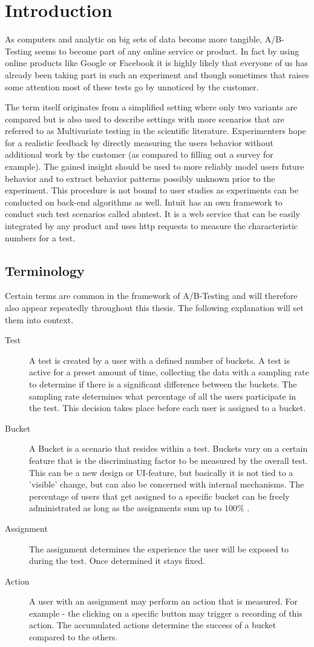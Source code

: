 \documentclass[main.tex]{subfiles}
\begin{document}
\chapter{Introduction}
As computers and analytic on big sets of data become more tangible, A/B-Testing seems to become part of any online service or product. In fact by using online products like Google or Facebook it is highly likely that everyone of us has already been taking part in such an experiment and though sometimes that raises some attention \cite{arthur2014facebook} most of these tests go by unnoticed by the customer. 

The term itself originates from a simplified setting where only two variants are compared but is also used to describe settings with more scenarios that are referred to as Multivariate testing in the scientific literature. Experimenters hope for a realistic feedback by directly measuring the users behavior without additional work by the customer (as compared to filling out a survey for example). The gained insight should be used to more reliably model users future behavior and to extract behavior patterns possibly unknown prior to the experiment. This procedure is not bound to user studies as experiments can be conducted on back-end algorithms as well. Intuit has an own framework to conduct such test scenarios called abntest. It is a web service that can be easily integrated by any product and uses http requests to measure the characteristic numbers for a test.
\section{Terminology}
Certain terms are common in the framework of A/B-Testing and will therefore also appear repeatedly throughout this thesis. The following explanation will set them into context.
\begin{description}
\item[Test]
A test is created by a user with a defined number of buckets. A test is active for a preset amount of time, collecting the data with a sampling rate to determine if there is a significant difference between the buckets. The sampling rate determines what percentage of all the users participate in the test. This decision takes place before each user is assigned to a bucket.
\item[Bucket]
A Bucket is a scenario that resides within a test. Buckets vary on a certain feature that is the discriminating factor to be measured by the overall test. This can be a new design or UI-feature, but basically it is not tied to a 'visible' change, but can also be concerned with internal mechanisms. The percentage of users that get assigned to a specific bucket can be freely administrated as long as the assignments sum up to $100\%$ .
\item[Assignment]
The assignment determines the experience the user will be exposed to during the test. Once determined it stays fixed.
\item[Action]
A user with an assignment may perform an action that is measured. For example - the clicking on a specific button may trigger a recording of this action. The accumulated actions determine the success of a bucket compared to the others. 
\end{description}
\end{document}
